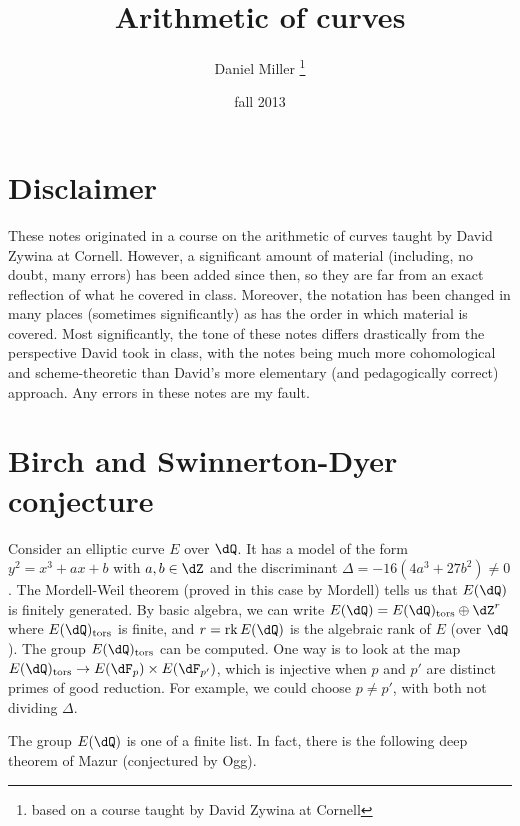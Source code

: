 \documentclass{article}
\title{Arithmetic of curves}
\author{Daniel Miller
  \thanks{based on a course taught by David Zywina at Cornell}}
\date{fall 2013}
\begin{document}
\maketitle
\tableofcontents




\newpage
\section*{Disclaimer}

These notes originated in a course on the arithmetic of curves taught by David 
Zywina at Cornell. However, a significant amount of material (including, no 
doubt, many errors) has been added since then, so they are far from an exact 
reflection of what he covered in class. Moreover, the notation has been changed 
in many places (sometimes significantly) as has the order in which material is 
covered. Most significantly, the tone of these notes differs drastically 
from the perspective David took in class, with the notes being much more 
cohomological and scheme-theoretic than David's more elementary (and 
pedagogically correct) approach. Any errors in these notes are my fault. 













\section{Birch and Swinnerton-Dyer conjecture}

Consider an elliptic curve $E$ over $\dQ$. It has a model of the form 
$y^2=x^3+a x+b$ with $a,b\in \dZ$ and the discriminant 
$\Delta=-16(4 a^3+27 b^2)\ne 0$. The Mordell-Weil theorem (proved in this case 
by Mordell) tells us that $E(\dQ)$ is finitely generated. By basic algebra, 
we can write $E(\dQ) = E(\dQ)_\text{tors}\oplus \dZ^r$ where 
$E(\dQ)_\text{tors}$ is finite, and $r=\rank E(\dQ)$ is the algebraic rank of 
$E$ (over $\dQ$). The group $E(\dQ)_\text{tors}$ can be computed. One way is to 
look at the map $E(\dQ)_\text{tors}\to E(\dF_p)\times E(\dF_{p'})$, which is 
injective when $p$ and $p'$ are distinct primes of good reduction. For 
example, we could choose $p\ne p'$, with both not dividing $\Delta$. 

The group $E(\dQ)$ is one of a finite list. In fact, there is the following 
deep theorem of Mazur (conjectured by Ogg).
\end{document}
